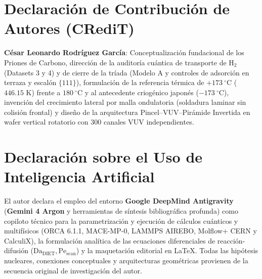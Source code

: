 \documentclass[10pt,twocolumn,a4paper]{article}
\begin{document}
\section*{Declaración de Contribución de Autores (CRediT)}
\textbf{César Leonardo Rodríguez García}: Conceptualización fundacional de los Priones de Carbono, dirección de la auditoría cuántica de transporte de $\text{H}_2$ (Datasets 3 y 4) y de cierre de la tríada (Modelo A y controles de adsorción en terraza y escalón $\{111\}$), formulación de la referencia térmica de $+173\ ^\circ\text{C}$ ($446.15\text{ K}$) frente a $180\ ^\circ\text{C}$ y al antecedente criogénico japonés ($-173\ ^\circ\text{C}$), invención del crecimiento lateral por malla ondulatoria (soldadura laminar sin colisión frontal) y diseño de la arquitectura Pincel--VUV--Pirámide Invertida en wafer vertical rotatorio con $300$ canales VUV independientes.

\section*{Declaración sobre el Uso de Inteligencia Artificial}
El autor declara el empleo del entorno \textbf{Google DeepMind Antigravity} (\textbf{Gemini 4 Argon} y herramientas de síntesis bibliográfica profunda) como copiloto técnico para la parametrización y ejecución de cálculos cuánticos y multifísicos (ORCA 6.1.1, MACE-MP-0, LAMMPS AIREBO, Molflow+ CERN y CalculiX), la formulación analítica de las ecuaciones diferenciales de reacción-difusión ($\text{Da}_{\text{DIET}}, \text{Pe}_{\text{scan}}$) y la maquetación editorial en \LaTeX. Todas las hipótesis nucleares, conexiones conceptuales y arquitecturas geométricas provienen de la secuencia original de investigación del autor.
\end{document}
